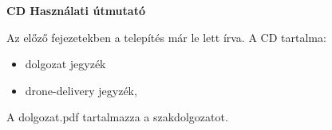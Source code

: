 \pagestyle{empty}

\noindent \textbf{\Large CD Használati útmutató}
%
%
%

Az előző fejezetekben a telepítés már le lett írva.
A CD tartalma:
\begin{itemize}
\item dolgozat jegyzék
\item drone-delivery jegyzék,
\end{itemize}
A dolgozat.pdf tartalmazza a szakdolgozatot.
